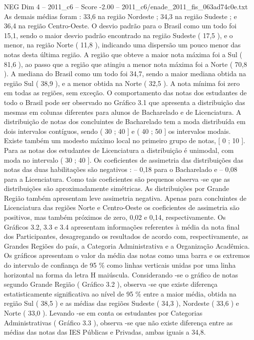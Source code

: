 \begin{textsample}{NEG Dim 4 – 2011\_c6 – Score -2.00 – 2011\_c6/enade\_2011\_fis\_063ad74c0e.txt}
As demais médias foram : 33,6 na região Nordeste ; 34,3 na região Sudeste ; e 36,4 na região Centro-Oeste.
O desvio padrão para o Brasil como um todo foi 15,1, sendo o maior desvio padrão encontrado na região Sudeste ( 17,5 ), e o menor, na região Norte ( 11,8 ), indicando uma dispersão um pouco menor das notas desta última região.
A região que obteve a maior nota máxima foi a Sul ( 81,6 ), ao passo que a região que atingiu a menor nota máxima foi a Norte ( 70,8 ).
A mediana do Brasil como um todo foi 34,7, sendo a maior mediana obtida na região Sul ( 38,9 ), e a menor obtida na Norte ( 32,5 ).
A nota mínima foi zero em todas as regiões, sem exceção.
O comportamento das notas dos estudantes de todo o Brasil pode ser observado no Gráfico 3.1 que apresenta a distribuição das mesmas em colunas diferentes para alunos de Bacharelado e de Licenciatura.
A distribuição de notas dos concluintes de Bacharelado tem a moda distribuída em dois intervalos contíguos, sendo ( 30 ; 40 ] e ( 40 ; 50 ] os intervalos modais.
Existe também um modesto máximo local no primeiro grupo de notas, [ 0 ; 10 ].
Para as notas dos estudantes de Licenciatura a distribuição é unimodal, com moda no intervalo ( 30 ; 40 ].
Os coeficientes de assimetria das distribuições das notas das duas habilitações são negativos : – 0,18 para o Bacharelado e – 0,08 para a Licenciatura.
Como tais coeficientes são pequenos observa -se que as distribuições são aproximadamente simétricas.
As distribuições por Grande Região também apresentam leve assimetria negativa.
Apenas para concluintes de Licenciatura das regiões Norte e Centro-Oeste os coeficientes de assimetria são positivos, mas também próximos de zero, 0,02 e 0,14, respectivamente.
Os Gráficos 3.2, 3.3 e 3.4 apresentam informações referentes à média da nota final dos Participantes, desagregando os resultados de acordo com, respectivamente, as Grandes Regiões do país, a Categoria Administrativa e a Organização Acadêmica.
Os gráficos apresentam o valor da média das notas como uma barra e os extremos do intervalo de confiança de 95 \% como linhas verticais unidas por uma linha horizontal na forma da letra H maiúscula.
Considerando -se o gráfico de notas segundo Grande Região ( Gráfico 3.2 ), observa -se que existe diferença estatisticamente significativa ao nível de 95 \% entre a maior média, obtida na região Sul ( 38,5 ) e as médias das regiões Sudeste ( 34,3 ), Nordeste ( 33,6 ) e Norte ( 33,0 ).
Levando -se em conta os estudantes por Categorias Administrativas ( Gráfico 3.3 ), observa -se que não existe diferença entre as médias das notas das IES Públicas e Privadas, ambas iguais a 34,8.

\end{textsample}
